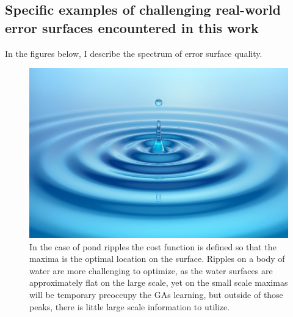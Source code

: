 \subsection{Specific examples of challenging real-world error surfaces encountered in this work}
In the figures below, I describe the spectrum of error surface quality.
\begin{figure}
\begin{center}
     \includegraphics[scale=0.65]{figures/pond_ripple_surface.png}
     \caption[Conceptualizing moderate to worst case error surfaces]{In the case of pond ripples the cost function is defined so that the maxima is the optimal location on the surface. Ripples on a body of water are more challenging to optimize, as the water surfaces are approximately flat on the large scale, yet on the small scale maximas will be temporary preoccupy the GAs learning, but outside of those peaks, there is little large scale information to utilize. }
      
      \label{fig:test1}
\end{center}

\end{figure}


